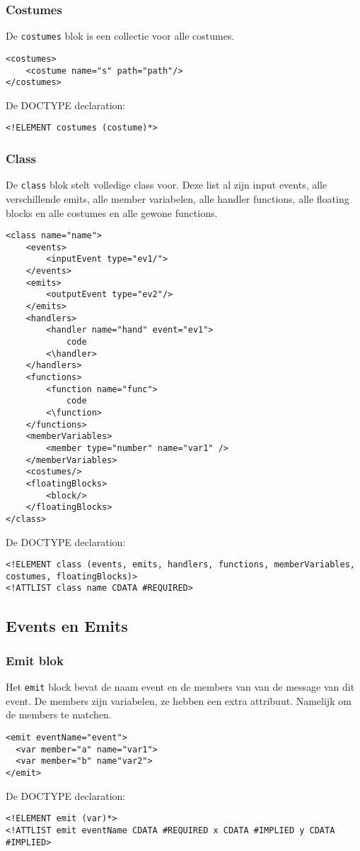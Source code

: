 \documentclass[]{article}
\begin{document}
\subsubsection{Costumes}
De \texttt{costumes} blok is een collectie voor alle costumes.
\lstset{language=XML}
\begin{lstlisting}
<costumes>
	<costume name="s" path="path"/>
</costumes>
\end{lstlisting}
De DOCTYPE declaration: 
\lstset{language=XML}
\begin{lstlisting}
<!ELEMENT costumes (costume)*>
\end{lstlisting}

\subsubsection{Class}
De \texttt{class} blok stelt volledige class voor. Deze list al zijn input events, alle verschillende emits, alle member variabelen, alle handler functions, alle floating blocks en alle costumes en alle gewone functions.
\lstset{language=XML}
\begin{lstlisting}
<class name="name">
	<events>
		<inputEvent type="ev1/">
	</events>
	<emits>
		<outputEvent type="ev2"/>
	</emits>
	<handlers>
		<handler name="hand" event="ev1">
			code
		<\handler>
	</handlers>
	<functions>
		<function name="func">
			code
		<\function>
	</functions>
	<memberVariables>
		<member type="number" name="var1" />
	</memberVariables>
	<costumes/>
	<floatingBlocks>
	    <block/>
	</floatingBlocks>
</class>
\end{lstlisting}
De DOCTYPE declaration: 
\lstset{language=XML}
\begin{lstlisting}
<!ELEMENT class (events, emits, handlers, functions, memberVariables, costumes, floatingBlocks)>
<!ATTLIST class name CDATA #REQUIRED>
\end{lstlisting}

\subsection{Events en Emits}
\subsubsection{Emit blok}
Het \texttt{emit} block bevat de naam event en de members van van de message van dit event.
De members zijn variabelen, ze hebben een extra attribuut. Namelijk om de members te matchen.
\lstset{language=XML}
\begin{lstlisting}
<emit eventName="event">
  <var member="a" name="var1">
  <var member="b" name"var2">
</emit>
\end{lstlisting}
De DOCTYPE declaration: 
\lstset{language=XML}
\begin{lstlisting}
<!ELEMENT emit (var)*>
<!ATTLIST emit eventName CDATA #REQUIRED x CDATA #IMPLIED y CDATA #IMPLIED>
\end{lstlisting}
\end{document}
